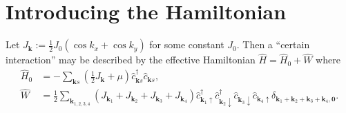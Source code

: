 \documentclass[english, parskip=full]{scrartcl}
\title{\titel}
\author{\autor}
\date{\today}
\newcommand{\kla}{}
\begin{document}
\maketitle  %

\section{Introducing the Hamiltonian}
Let $J_\textbf{k} := \frac{1}{2} J_0 \kla\left( \cos k_x + \cos k_y \right)$ for some constant $J_0$.
Then a ``certain interaction'' may be described by the effective Hamiltonian $\hat{H} = \hat{H}_0 + \hat{W}$ where
\begin{align}
\hat{H}_0 &= -\sum_{\textbf{k}s} \kla\left( \frac{1}{2} J_\textbf{k} + \mu  \right) \hat{c}_{\textbf{k}s}^\dagger  \hat{c}_{\textbf{k}s},\\
\hat{W} &= \frac{1}{2} \sum_{\textbf{k}_{1,2,3,4}} \kla\left( J_{\textbf{k}_1} + J_{\textbf{k}_2} + J_{\textbf{k}_3} + J_{\textbf{k}_4} \right)  \hat{c}_{\textbf{k}_1 \uparrow}^\dagger \hat{c}_{\textbf{k}_2 \downarrow}^\dagger \hat{c}_{\textbf{k}_3 \downarrow} \hat{c}_{\textbf{k}_4 \uparrow} \delta_{\textbf{k}_1 + \textbf{k}_2 + \textbf{k}_3 + \textbf{k}_4, \textbf{0} }.
\end{align}
\end{document}
